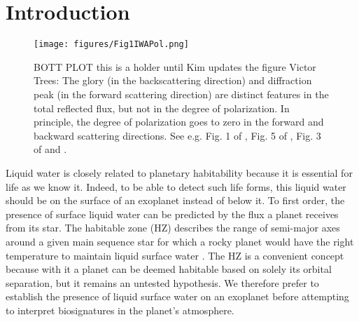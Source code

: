 \documentclass[
    usenatbib,
]{mnras}
\begin{document}
\section{Introduction}
\label{sec:intro}

\begin{figure*}%
   \centering
   \texttt{[image: figures/Fig1IWAPol.png]}
   \caption{BOTT PLOT this is a holder until Kim updates the figure {\color{Green}Victor Trees: The glory (in the backscattering direction) and diffraction peak (in the forward scattering direction) are distinct features in the total reflected flux, but not in the degree of polarization. In principle, the degree of polarization goes to zero in the forward and backward scattering directions. See e.g. Fig. 1 of \citet{stam2008}, Fig. 5 of \citet{trees2022}, Fig. 3 of \citet{karalidi2011} and \citet{hansentravis1974}.}}
    \label{fig:bottplot}
\end{figure*}


Liquid water is closely related to planetary habitability because it is essential for life as we know it. 
Indeed, to be able to detect such life forms, this liquid water should be on the surface of an exoplanet instead of below it.
To first order, the presence of surface liquid water can be predicted by the flux a planet receives from its star. The habitable zone (HZ) describes the range of semi-major axes around a given main sequence star for which a rocky planet would have the right temperature to maintain liquid surface water \citep{kasting93}. 
The HZ is a convenient concept because with it a planet can be deemed habitable based on solely its orbital separation, but it remains an untested hypothesis. 
We therefore prefer to establish the presence of liquid surface water on an exoplanet before attempting to interpret biosignatures in the planet's atmosphere. 

\end{document}
